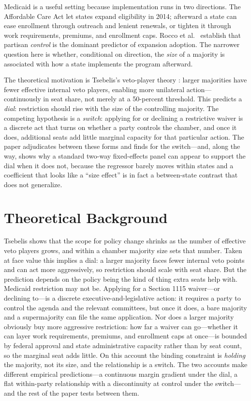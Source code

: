 \documentclass[9pt,twoside]{pnas-new}
\begin{document}
Medicaid is a useful setting because implementation runs in two directions. The Affordable Care Act let states expand eligibility in 2014; afterward a state can ease enrollment through outreach and lenient renewals, or tighten it through work requirements, premiums, and enrollment caps. Rocco et al.\ \cite{rocco2020} establish that partisan \emph{control} is the dominant predictor of expansion adoption. The narrower question here is whether, conditional on direction, the \emph{size} of a majority is associated with how a state implements the program afterward.

The theoretical motivation is Tsebelis's veto-player theory \cite{tsebelis2002}: larger majorities have fewer effective internal veto players, enabling more unilateral action---continuously in seat share, not merely at a 50-percent threshold. This predicts a \emph{dial}: restriction should rise with the size of the controlling majority. The competing hypothesis is a \emph{switch}: applying for or declining a restrictive waiver is a discrete act that turns on whether a party controls the chamber, and once it does, additional seats add little marginal capacity for that particular action. The paper adjudicates between these forms and finds for the switch---and, along the way, shows why a standard two-way fixed-effects panel can appear to support the dial when it does not, because the regressor barely moves within states and a coefficient that looks like a ``size effect'' is in fact a between-state contrast that does not generalize.

\section*{Theoretical Background}

Tsebelis \cite{tsebelis2002} shows that the scope for policy change shrinks as the number of effective veto players grows, and within a chamber majority size sets that number. Taken at face value this implies a dial: a larger majority faces fewer internal veto points and can act more aggressively, so restriction should scale with seat share. But the prediction depends on the policy being the kind of thing extra seats help with. Medicaid restriction may not be. Applying for a Section 1115 waiver---or declining to---is a discrete executive-and-legislative action: it requires a party to control the agenda and the relevant committees, but once it does, a bare majority and a supermajority can file the same application. Nor does a larger majority obviously buy more aggressive restriction: how far a waiver can go---whether it can layer work requirements, premiums, and enrollment caps at once---is bounded by federal approval and state administrative capacity rather than by seat count, so the marginal seat adds little. On this account the binding constraint is \emph{holding} the majority, not its size, and the relationship is a switch. The two accounts make different empirical predictions---a continuous margin gradient under the dial, a flat within-party relationship with a discontinuity at control under the switch---and the rest of the paper tests between them.
\end{document}
